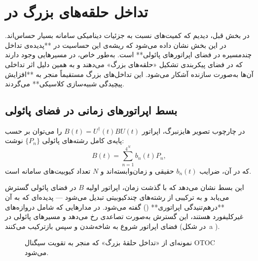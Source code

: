 \section{تداخل حلقه‌های بزرگ در }
\label{sec:large-loop}

در بخش قبل، دیدیم که کمیت‌های  نسبت به جزئیات دینامیکی سامانه بسیار حساس‌اند. در این بخش نشان داده می‌شود که ریشه‌ی این حساسیت در **پدیده‌ی تداخل چندمسیره در فضای اپراتورهای پائولی** است.  
به‌طور خاص، در  مسیرهایی وجود دارند که در فضای پیکربندی تشکیل «حلقه‌های بزرگ» می‌دهند و به همین دلیل اثر تداخلی آن‌ها به‌صورت سازنده آشکار می‌شود. این تداخل‌های بزرگ مستقیماً منجر به **افزایش پیچیدگی شبیه‌سازی کلاسیکی** می‌گردند.
\subsection{بسط اپراتورهای زمانی در فضای پائولی}

در چارچوب تصویر هایزنبرگ، اپراتور \( B(t) = U^\dagger(t) B U(t) \) را می‌توان بر حسب پایه‌ی کامل رشته‌های پائولی \(\{P_n\}\) نوشت:
\[
B(t) = \sum_{n=1}^{4^N} b_n(t) P_n,
\]
که در آن، ضرایب \(b_n(t)\) حقیقی و زمان‌وابسته‌اند و \(N\) تعداد کیوبیت‌های سامانه است.

این بسط نشان می‌دهد که با گذشت زمان، اپراتور اولیه \(B\) در فضای پائولی گسترش می‌یابد و به ترکیبی از رشته‌های چندکیوبیتی تبدیل می‌شود — پدیده‌ای که به آن **درهم‌تنیدگی اپراتوری** () گفته می‌شود.  
در مدارهایی که شامل دروازه‌های غیرکلیفورد هستند، این گسترش به‌صورت تصاعدی رخ می‌دهد و مسیرهای پائولی در فضای اپراتور شروع به شاخه‌شدن و سپس بازترکیب می‌کنند (در شکل~a \lr{\ref{fig3}}).
\begin{figure}[htbp]
	\centering
	\caption{نمونه‌ای از «تداخل حلقهٔ بزرگ» که منجر به تقویت سیگنال OTOC می‌شود. }
	\label{fig3}
\end{figure}


